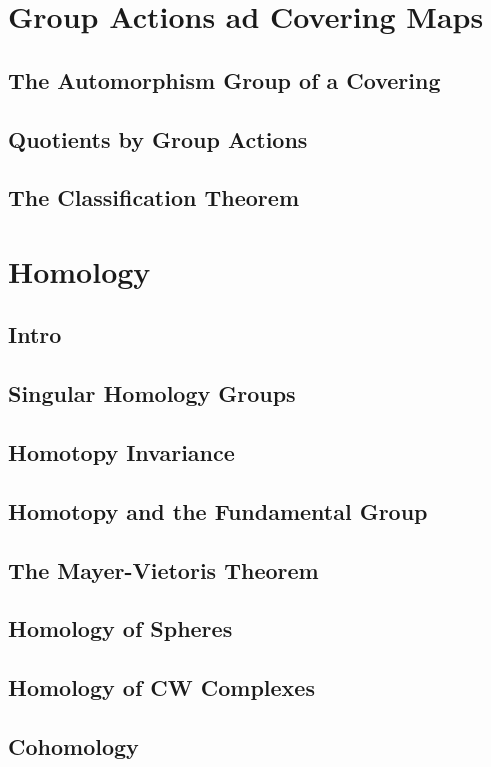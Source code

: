 \section{Group Actions ad Covering Maps}
\label{section-group-actions-ad-covering-maps}

\subsection{The Automorphism Group of a Covering}
\label{subsection-the-automorphism-group-of-a-covering}

\subsection{Quotients by Group Actions}
\label{subsection-quotients-by-group-actions}

\subsection{The Classification Theorem}
\label{subsection-covering-maps-the-classification-theorem}

\section{Homology}
\label{section-homology}

\subsection{Intro}
\label{subsection-homology-intro}

\subsection{Singular Homology Groups}
\label{subsection-singular-homology-groups}

\subsection{Homotopy Invariance}
\label{subsection-homotopy-invariance}

\subsection{Homotopy and the Fundamental Group}
\label{subsection-homotopy-and-the-fundamental-group}

\subsection{The Mayer-Vietoris Theorem}
\label{subsection-the-mayer-vietoris-theorem}

\subsection{Homology of Spheres}
\label{subsection-homology-of-spheres}

\subsection{Homology of CW Complexes}
\label{subsection-homology-of-cw-complexes}

\subsection{Cohomology}
\label{subsection-cohomology}


